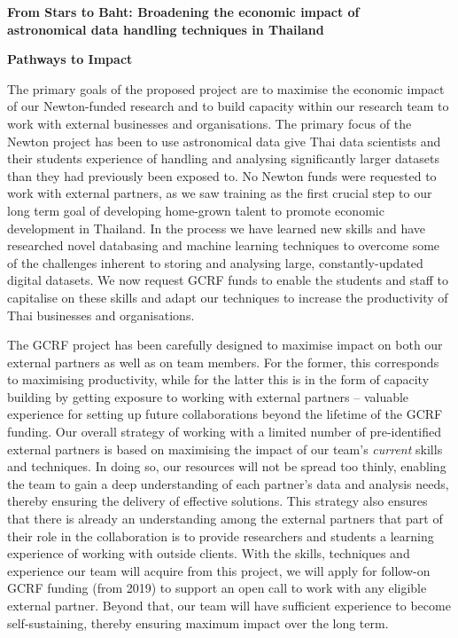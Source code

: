 \documentclass[11pt]{article}
\begin{document}
  \setcounter{figure}{0}
  \noindent
  {\LARGE \bf From Stars to Baht: Broadening the economic impact of \\
  astronomical data handling techniques in Thailand}
  
  \vspace{3mm}
  \noindent
  {\LARGE \bf Pathways to Impact}
  
  \vspace{3mm}
  \noindent
  The primary goals of the proposed project are to maximise the economic impact of our Newton-funded research and to build capacity within our research team to work with external businesses and organisations. The primary focus of the Newton project has been to use astronomical data give Thai data scientists and their students experience of handling and analysing significantly larger datasets than they had previously been exposed to. No Newton funds were requested to work with external partners, as we saw training as the first crucial step to our long term goal of developing home-grown talent to promote economic development in Thailand. In the process we have learned new skills and have researched novel databasing and machine learning techniques to overcome some of the challenges inherent to storing and analysing large, constantly-updated digital datasets. We now request GCRF funds to enable the students and staff to capitalise on these skills and adapt our techniques to increase the productivity of Thai businesses and organisations.  
  
  \vspace{2mm}
  \noindent
  The GCRF project has been carefully designed to maximise impact on both our external partners as well as on team members. For the former, this corresponds to maximising productivity, while for the latter this is in the form of capacity building by getting exposure to working with external partners -- valuable experience for setting up future collaborations beyond the lifetime of the GCRF funding. Our overall strategy of working with a limited number of pre-identified external partners is based on maximising the impact of our team's {\it current} skills and techniques. In doing so, our resources will not be spread too thinly, enabling the team to gain a deep understanding of each partner's data and analysis needs, thereby ensuring the delivery of effective solutions. This strategy also ensures that there is already an understanding among the external partners that part of their role in the collaboration is to provide researchers and students a learning experience of working with outside clients. With the skills, techniques and experience our team will acquire from this project, we will apply for follow-on GCRF funding (from 2019) to support an open call to work with any eligible external partner. Beyond that, our team will have sufficient experience to become self-sustaining, thereby ensuring maximum impact over the long term.
  
\end{document}
